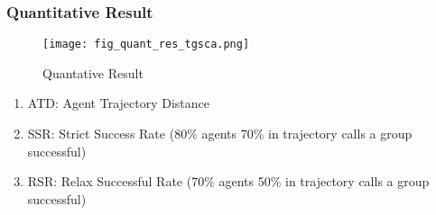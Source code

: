 \begin{frame}
    \frametitle{Quantitative Result}
    \begin{figure}
        \texttt{[image: fig\_quant\_res\_tgsca.png]}
        \caption{Quantative Result}
    \end{figure}
    \begin{enumerate}
        \item ATD: Agent Trajectory Distance
        \item SSR: Strict Success Rate (80\% agents 70\% in trajectory calls a group successful)
        \item RSR: Relax Successful Rate (70\% agents 50\% in trajectory calls a group successful)
    \end{enumerate}
\end{frame}